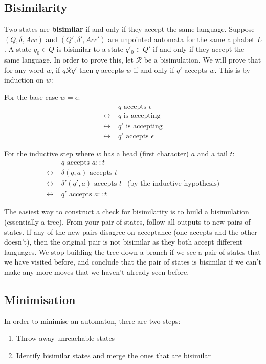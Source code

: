 \documentclass[11pt]{article}
\begin{document}
	\subsection{Bisimilarity}
	Two states are \textbf{bisimilar} if and only if they accept the same language. Suppose $(Q, \delta, Acc)$ and $(Q', \delta ', Acc')$ are unpointed automata for the same alphabet $L$. A state $q_{0} \in Q$ is bisimilar to a state $q'_{0} \in Q'$ if and only if they accept the same language. In order to prove this, let $\mathcal{R}$ be a bisimulation. We will prove that for any word $w$, if $q \mathcal{R} q'$ then $q$ accepts $w$ if and only if $q'$ accepts $w$. This is by induction on $w$:
	
	\par 
	For the base case $w = \epsilon$:
	\begin{align*}
		&\;q \text{ accepts } \epsilon \\
			\leftrightarrow & \;q \text{ is accepting } \\ 
			\leftrightarrow & \;q' \text{ is accepting} \\
			\leftrightarrow & \;q' \text{ accepts } \epsilon
	\end{align*}
	
	For the inductive step where $w$ has a head (first character) $a$ and a tail $t$:
	\begin{align*}
		 &\;q \text{ accepts } a::t \\
			\leftrightarrow &\;\delta (q,a) \text{ accepts }  t \\ 
			\leftrightarrow &\;\delta'(q', a) \text{ accepts } t & \text{(by the inductive hypothesis)}\\
			\leftrightarrow &\;q' \text{ accepts } a :: t
	\end{align*}
	
	The easiest way to  construct a check for bisimilarity is to build a bisimulation (essentially a tree). From your pair of states, follow all outputs to new pairs of states. If any of the new pairs disagree on acceptance (one accepts and the other doesn't), then the original pair is not bisimilar as they both accept different languages. We stop building the tree down a branch if we see a pair of states that we have visited before, and conclude that the pair of states is bisimilar if we can't make any more moves that we haven't already seen before.
	\subsection{Minimisation}
	In order to minimise an automaton, there are two steps:
	\begin{enumerate}
		\item Throw away unreachable states
		\item Identify bisimilar states and merge the ones that are bisimilar
	\end{enumerate}
	
\end{document}
